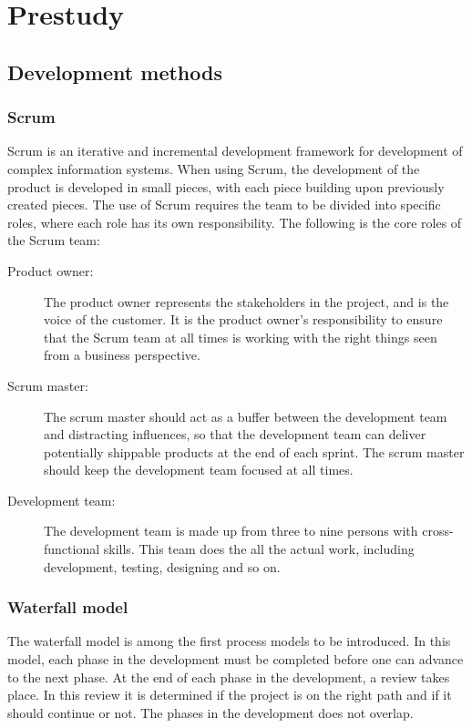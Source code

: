 \section{Prestudy}
\subsection{Development methods}
\subsubsection{Scrum}
Scrum is an iterative and incremental development framework for development of complex information systems. When using Scrum, the development of the product is developed in small pieces, with each piece building upon previously created pieces. The use of Scrum requires the team to be divided into specific roles, where each role has its own responsibility. The following is the core roles of the Scrum team:
\begin{description}
	\item[Product owner:]{The product owner represents the stakeholders in the project, and is the voice of the customer. It is the product owner's responsibility to ensure that the Scrum team at all times is working with the right things seen from a business perspective.}
	\item[Scrum master:]{The scrum master should act as a buffer between the development team and distracting influences, so that the development team can deliver potentially shippable products at the end of each sprint. The scrum master should keep the development team focused at all times.}
	\item[Development team:]{The development team is made up from three to nine persons with cross-functional skills. This team does the all the actual work, including development, testing, designing and so on.}
\end{description}

\subsubsection{Waterfall model}
The waterfall model is among the first process models to be introduced. In this model, each phase in the development must be completed before one can advance to the next phase. At the end of each phase in the development, a review takes place. In this review it is determined if the project is on the right path and if it should continue or not. The phases in the development does not overlap.

